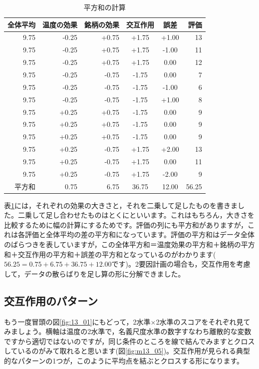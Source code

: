 \documentclass{ltjbook}
\begin{document}
\begin{table}[ht]
	\centering
	\caption{平方和の計算}
	\begin{tabular}{rrrccr}
		\hline
		全体平均 & 温度の効果 & 銘柄の効果 & 交互作用  & 誤差    & 評価    \\
		\hline
		9.75 & -0.25 & +0.75 & +1.75 & +1.00 & 13    \\
		9.75 & -0.25 & +0.75 & +1.75 & -1.00 & 11    \\
		9.75 & -0.25 & +0.75 & +1.75 & 0.00  & 12    \\ \hline
		9.75 & -0.25 & -0.75 & -1.75 & 0.00  & 7     \\
		9.75 & -0.25 & -0.75 & -1.75 & -1.00 & 6     \\
		9.75 & -0.25 & -0.75 & -1.75 & +1.00 & 8     \\ \hline
		9.75 & +0.25 & +0.75 & -1.75 & 0.00  & 9     \\
		9.75 & +0.25 & +0.75 & -1.75 & 0.00  & 9     \\
		9.75 & +0.25 & +0.75 & -1.75 & 0.00  & 9     \\ \hline
		9.75 & +0.25 & -0.75 & +1.75 & +2.00 & 13    \\
		9.75 & +0.25 & -0.75 & +1.75 & 0.00  & 11    \\
		9.75 & +0.25 & -0.75 & +1.75 & -2.00 & 9     \\
		\hline\hline
		平方和  & 0.75  & 6.75  & 36.75 & 12.00 & 56.25 \\\hline
	\end{tabular}
	\label{tbl::13_04}
\end{table}
表\ref{tbl::13_04}には，それぞれの効果の大きさと，それを二乗して足したものを書きました。二乗して足し合わせたものはとくにといいます。これはもちろん，大きさを比較するために幅の計算にするためです。評価の列にも平方和がありますが，これは各評価と全体平均の差の平方和になっています。評価の平方和はデータ全体のばらつきを表していますが，この全体平方和＝温度効果の平方和＋銘柄の平方和＋交互作用の平方和＋誤差の平方和となっているのがわかります($56.25=0.75+6.75+36.75+12.00$です)。2要因計画の場合も，交互作用を考慮して，データの散らばりを足し算の形に分解できました。

\subsection{交互作用のパターン}
もう一度冒頭の図\ref{fig:13_01}にもどって，2水準$\times$2水準のスコアをそれぞれ見てみましょう。横軸は温度の2水準で，名義尺度水準の数字すなわち離散的な変数ですから適切ではないのですが，同じ条件のところを線で結んでみますとクロスしているのがみて取れると思います(図\ref{fig:m13_05})。交互作用が見られる典型的なパターンの1つが，このように平均点を結ぶとクロスする形になります。
\end{document}
